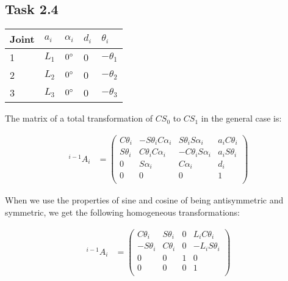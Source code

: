 \subsection*{Task 2.4}
\begin{center}
	\begin{tabular}{ | l | l | l | l | l |}
		\hline
		Joint & $a_{i}$ & $\alpha_{i}$ & $d_i$ & $\theta_i$ \\ \hline
		1 & $L_1$ & $0\degree$ & 0 & $-\theta_1$\\ \hline
		2 & $L_2$ & $0\degree$ & 0 & $-\theta_2$\\ \hline
		3 & $L_3$ & $0\degree$ & 0 & $-\theta_3$\\ \hline
	\end{tabular}
\end{center}

The matrix of a total transformation of $CS_0$ to $CS_1$ in the general case is:

\begin{align*}
^{i-1}A_i &= 
\begin{pmatrix}
C\theta_i & -S\theta_iC\alpha_i & S\theta_iS\alpha_i & a_iC\theta_i \\
S\theta_i & C\theta_iC\alpha_i & -C\theta_iS\alpha_i & a_iS\theta_i \\
0 & S\alpha_i & C\alpha_i & d_i \\
0 & 0 & 0 & 1 \\
\end{pmatrix}
\end{align*}

When we use the properties of sine and cosine of being antisymmetric and symmetric, we get the following homogeneous transformations:

\begin{align*}
^{i-1}A_i &= 
\begin{pmatrix}
C\theta_i & S\theta_i & 0 & L_iC\theta_i \\
-S\theta_i & C\theta_i & 0 & -L_iS\theta_i \\
0 & 0 & 1 & 0 \\
0 & 0 & 0 & 1 \\
\end{pmatrix}
\end{align*}